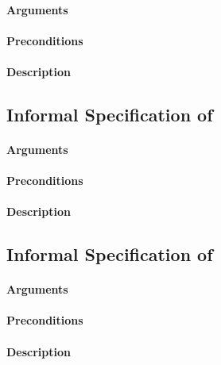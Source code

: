 \paragraph{Arguments}

\paragraph{Preconditions}

\paragraph{Description}

\subsection{Informal Specification of }

\paragraph{Arguments}

\paragraph{Preconditions}

\paragraph{Description}

\subsection{Informal Specification of }


\paragraph{Arguments}

\paragraph{Preconditions}

\paragraph{Description}



